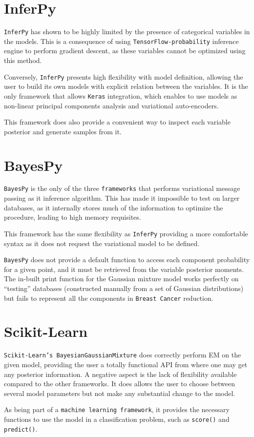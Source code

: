 \section*{InferPy}
\texttt{InferPy} has shown to be highly limited by the presence of categorical variables in the models. This is a consequence of using \texttt{TensorFlow-probability} inference engine to perform gradient descent, as these variables cannot be optimized using this method.

Conversely, \texttt{InferPy} presents high flexibility with model definition, allowing the user to build its own models with explicit relation between the variables. It is the only framework that allows \texttt{Keras} integration, which enables to use models as non-linear principal components analysis and variational auto-encoders.

This framework does also provide a convenient way to inspect each variable posterior and generate samples from it.


\section*{BayesPy}

\texttt{BayesPy} is the only of the three \texttt{frameworks} that performs variational message passing as it inference algorithm. This has made it impossible to test on larger databases, as it internally stores much of the information to optimize the procedure, leading to high memory requisites.

This framework has the same flexibility as \texttt{InferPy} providing a more comfortable syntax as it does not request the variational model to be defined.

\texttt{BayesPy} does not provide a default function to access each component probability for a given point, and it must be retrieved from the variable posterior moments. The in-built print function for the Gaussian mixture model works perfectly on ``testing'' databases (constructed manually from a set of Gaussian distributions) but fails to represent all the components in \texttt{Breast Cancer} reduction.

\section*{Scikit-Learn}

\texttt{Scikit-Learn's BayesianGaussianMixture} does correctly perform EM on the given model, providing the user a totally functional API from where one may get any posterior information. A negative aspect is the lack of flexibility available compared to the other frameworks. It does allows the user to choose between several model parameters but not make any substantial change to the model.

As being part of a \texttt{machine learning framework}, it provides the necessary functions to use the model in a classification problem, such as \texttt{score()} and \texttt{predict()}.

